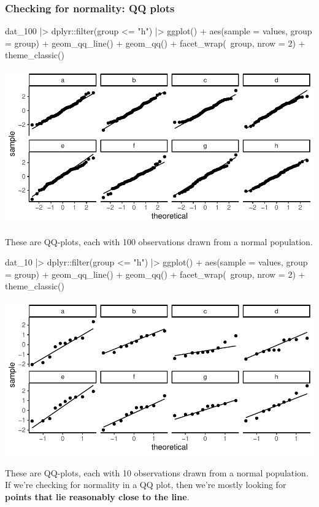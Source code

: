 \documentclass[a4paper]{article}
\begin{document}
\subsubsection{Checking for normality: QQ plots}
\begin{Schunk}
\begin{Sinput}
dat_100 |> dplyr::filter(group <= "h") |> 
  ggplot() + 
  aes(sample = values, group = group) + 
  geom_qq_line() + geom_qq() + 
  facet_wrap(~group, nrow = 2) +
  theme_classic()
\end{Sinput}


{\centering \includegraphics[width=\maxwidth]{figure/listings-unnamed-chunk-105-1} 

}

\end{Schunk}
These are QQ-plots, each with \textcolor{mygreen}{100} observations drawn from a normal population.
\begin{Schunk}
\begin{Sinput}
dat_10 |> dplyr::filter(group <= "h") |> 
  ggplot() + 
  aes(sample = values, group = group) + 
  geom_qq_line() + geom_qq() + 
  facet_wrap(~group, nrow = 2) +
  theme_classic()
\end{Sinput}


{\centering \includegraphics[width=\maxwidth]{figure/listings-unnamed-chunk-106-1} 

}

\end{Schunk}
These are QQ-plots, each with \textcolor{mygreen}{10} observations drawn from a normal population.\\
If we're checking for normality in a QQ plot, then we're mostly looking for \textbf{points that lie reasonably close to the line}.
\end{document}
